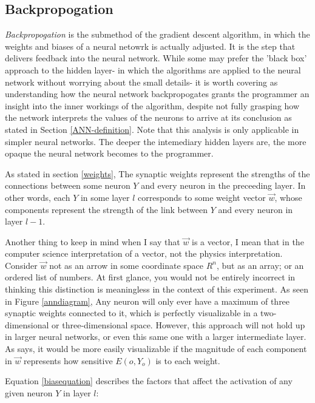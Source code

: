 \documentclass[12pt]{article}
\begin{document}
    \subsection{Backpropogation \label{backprop}}

        \textit{Backpropogation} is the submethod of the gradient descent algorithm, in which the weights and biases of a neural netowrk is actually adjusted. It is the step that delivers feedback into the neural network. While some may prefer the 'black box' approach to the hidden layer- in which the algorithms are applied to the neural network without worrying about the small details- it is worth covering as understanding how the neural network backpropogates grants the programmer an insight into the inner workings of the algorithm, despite not fully grasping how the network interprets the values of the neurons to arrive at its conclusion as stated in Section \ref{ANN-definition}. Note that this analysis is only applicable in simpler neural networks. The deeper the intemediary hidden layers are, the more opaque the neural network becomes to the programmer.

        As stated in section \ref{weights}, The synaptic weights represent the strengths of the connections between some neuron $Y$ and every neuron in the preceeding layer. In other words, each $Y$ in some layer $l$ corresponds to some weight vector $\vec w$, whose components represent the strength of the link between $Y$ and every neuron in layer $l-1$.

        Another thing to keep in mind when I say that $\vec w$ is a vector, I mean that in the computer science interpretation of a vector, not the physics interpretation. Consider $\vec{w}$ not as an arrow in some coordinate space $R^n$, but as an array; or an ordered list of numbers. At first glance, you would not be entirely incorrect in thinking this distinction is meaningless in the context of this experiment. As seen in Figure \ref{anndiagram}, Any neuron will only ever have a maximum of three synaptic weights connected to it, which is perfectly visualizable in a two-dimensional or three-dimensional space. However, this approach will not hold up in larger neural networks, or even this same one with a larger intermediate layer. As \textcite{DeepLearningCh3} says, it would be more easily visualizable if the magnitude of each component in $\vec w$ represents how sensitive $E(o, Y_o)$ is to each weight.

        Equation \ref{biasequation} describes the factors that affect the activation of any given neuron $Y$ in layer $l$:
\end{document}
